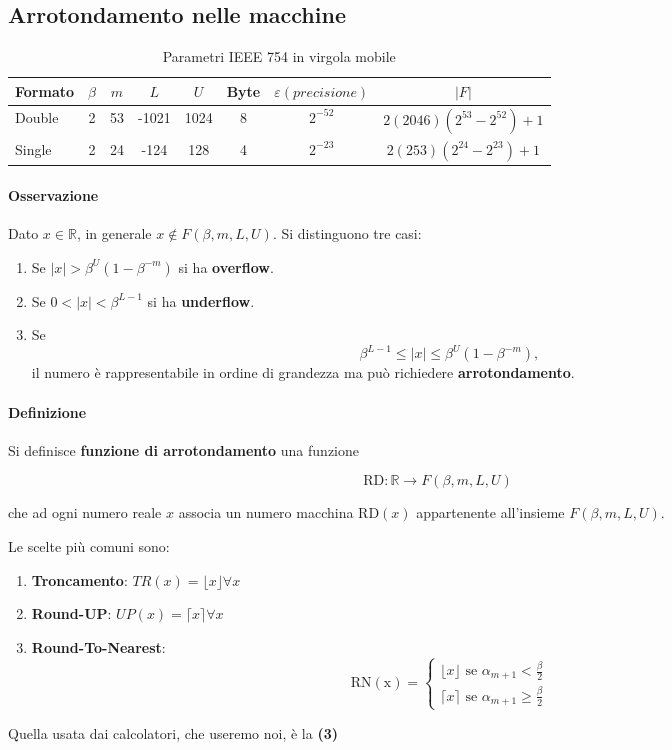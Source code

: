 \documentclass[a4paper,12pt]{article}
\begin{document}
	\subsection{Arrotondamento nelle macchine}
	\begin{table}[h!]
		\centering
		\begin{tabular}{l c c c c c c c}
			\toprule
			Formato & $\beta$ & $m$ & $L$ & $U$ & Byte & $\varepsilon (precisione)$ & $|F|$ \\
			\midrule
			Double & 2 & 53 & -1021 & 1024 & 8 & $2^{-52}$ & $2(2046)(2^{53}-2^{52})+1$ \\
			Single & 2 & 24 & -124  & 128  & 4 & $2^{-23}$ & $2(253)(2^{24}-2^{23})+1$ \\
			\bottomrule
		\end{tabular}
		\caption{Parametri IEEE 754 in virgola mobile}
	\end{table}
	\paragraph{Osservazione}
	Dato $x \in \mathbb{R}$, in generale $x \notin F(\beta,m,L,U)$.
	Si distinguono tre casi:
	
	\begin{enumerate}
		\item Se $|x| > \beta^{U}(1-\beta^{-m})$ si ha \textbf{overflow}.
		
		\item Se $0 < |x| < \beta^{L-1}$ si ha \textbf{underflow}.
		
		\item Se
		\[
		\beta^{L-1} \le |x| \le \beta^{U}(1-\beta^{-m}),
		\]
		il numero è rappresentabile in ordine di grandezza ma può richiedere
		\textbf{arrotondamento}.
	\end{enumerate}
	
	\paragraph{Definizione}
	Si definisce \textbf{funzione di arrotondamento} una funzione
	
	\[
	\mathrm{RD} : \mathbb{R} \longrightarrow F(\beta,m,L,U)
	\]
	
	che ad ogni numero reale $x$ associa un numero macchina
	$\mathrm{RD}(x)$ appartenente all'insieme $F(\beta,m,L,U)$.	
	
	Le scelte più comuni sono:
	\begin{enumerate}
		\item \textbf{Troncamento}: $TR(x) = \lfloor x \rfloor \forall x$
		\item \textbf{Round-UP}: $UP(x) = \lceil x \rceil \forall x$
		\item \textbf{Round-To-Nearest}: 
		\[
		\mathrm{RN(x)} = 
		\begin{cases}
			\lfloor x \rfloor \textrm{ se } \alpha_{m+1} < \frac{\beta}{2} \\
			\lceil x \rceil \textrm{ se } \alpha_{m+1} \geq \frac{\beta}{2}
		\end{cases}
		\]
	\end{enumerate}
	Quella usata dai calcolatori, che useremo noi, è la \textbf{(3)}
	
\end{document}
